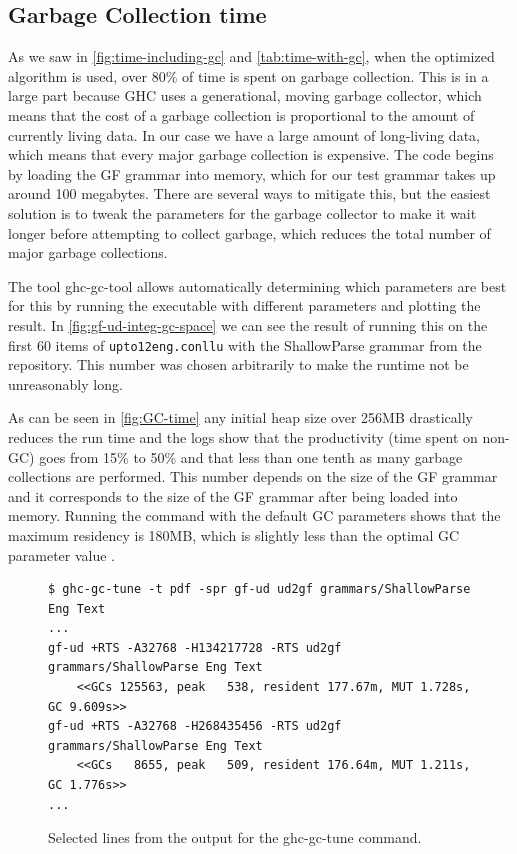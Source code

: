 \subsection{Garbage Collection time}\label{sect:gc-time}
As we saw in \autoref{fig:time-including-gc} and \autoref{tab:time-with-gc}, when the optimized algorithm is used, over 80\% of time is spent on garbage collection. This is in a large part because GHC uses a generational, moving garbage collector\cite{ungar1984generation}, which means that the cost of a garbage collection is proportional to the amount of currently living data. %
In our case we have a large amount of long-living data, which means that every major garbage collection is expensive. The code begins by loading the GF grammar into memory, which for our test grammar takes up around 100 megabytes. There are several ways to mitigate this, but the easiest solution is to tweak the parameters for the garbage collector to make it wait longer before attempting to collect garbage, which reduces the total number of major garbage collections.

The tool ghc-gc-tool allows automatically determining which parameters are best for this by running the executable with different parameters and plotting the result. In \autoref{fig:gf-ud-integ-gc-space} we can see the result of running this on the first 60 items of \texttt{upto12eng.conllu} with the ShallowParse grammar from the repository. This number was chosen arbitrarily to make the runtime not be unreasonably long. 

As can be seen in \autoref{fig:GC-time} any initial heap size over 256MB drastically reduces the run time and the logs show that the productivity (time spent on non-GC) goes from 15\% to 50\% and that less than one tenth as many garbage collections are performed. This number depends on the size of the GF grammar and it corresponds to the size of the GF grammar after being loaded into memory. Running the command with the default GC parameters shows that the maximum residency is 180MB, which is slightly less than the optimal GC parameter value .


\begin{figure}
    \centering
\begin{verbatim}
$ ghc-gc-tune -t pdf -spr gf-ud ud2gf grammars/ShallowParse Eng Text
...
gf-ud +RTS -A32768 -H134217728 -RTS ud2gf grammars/ShallowParse Eng Text
    <<GCs 125563, peak   538, resident 177.67m, MUT 1.728s, GC 9.609s>>
gf-ud +RTS -A32768 -H268435456 -RTS ud2gf grammars/ShallowParse Eng Text
    <<GCs   8655, peak   509, resident 176.64m, MUT 1.211s, GC 1.776s>>
...
\end{verbatim}
    \caption{Selected lines from the output for the ghc-gc-tune command.}
    \label{fig:ghc-gc-tune-text-output}
\end{figure}

